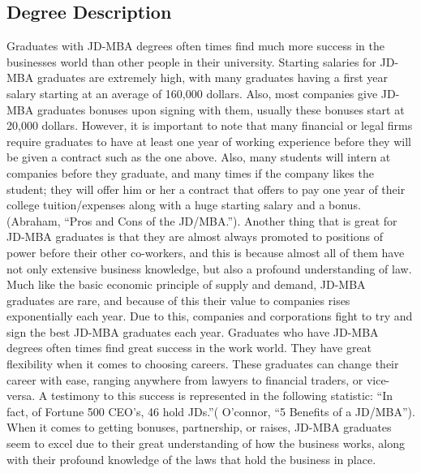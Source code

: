 \begin{multicols}{2}
\section{Degree Description}
	Graduates with JD-MBA degrees often times find much more success in the businesses world than other people in their university. Starting salaries for JD-MBA graduates are extremely high, with many graduates having a first year salary starting at an average of 160,000 dollars. Also, most companies give JD-MBA graduates bonuses upon signing with them, usually these bonuses start at 20,000 dollars. However, it is important to note that many financial or legal firms require graduates to have at least one year of working experience before they will be given a contract such as the one above. Also, many students will intern at companies before they graduate, and many times if the company likes the student; they will offer him or her a contract that offers to pay one year of their college tuition/expenses along with a huge starting salary and a bonus. (Abraham, “Pros and Cons of the JD/MBA.”). Another thing that is great for JD-MBA graduates is that they are almost always promoted to positions of power before their other co-workers, and this is because almost all of them have not only extensive business knowledge, but also a profound understanding of law. Much like the basic economic principle of supply and demand, JD-MBA graduates are rare, and because of this their value to companies rises exponentially each year.  Due to this, companies and corporations fight to try and sign the best JD-MBA graduates each year. Graduates who have JD-MBA degrees often times find great success in the work world. They have great flexibility when it comes to choosing careers. These graduates can change their career with ease, ranging anywhere from lawyers to financial traders, or vice-versa. A testimony to this success is represented in the following statistic: “In fact,  of Fortune 500 CEO’s, 46 hold JDs.”( O’connor, “5 Benefits of a JD/MBA”). When it comes to getting bonuses, partnership, or raises, JD-MBA graduates seem to excel due to their great understanding of how the business works, along with their profound knowledge of the laws that hold the business in place.


\end{multicols}
